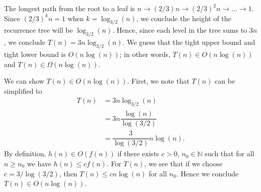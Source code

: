 \documentclass[11pt, letterpaper, titlepage]{article}
\begin{document}
\begin{enumerate}[label=\alph*)]
    \begin{figure}[H]
    \centering
    \end{figure}

    The longest path from the root to a leaf is $n \rightarrow (2/3)n \rightarrow (2/3)^2n \rightarrow \ldots \rightarrow 1$. Since $(2/3)^kn = 1$ when $k = \log_{3/2}(n)$, we conclude the height of the recurrence tree will be $\log_{3/2}(n)$. Hence, since each level in the tree sums to $3n$, we conclude $T(n) = 3n\log_{3/2}(n)$. We guess that the tight upper bound and tight lower bound is $O(n\log(n))$; in other words, $T(n) \in O(n\log(n))$ and $T(n) \in \Omega(n\log(n))$.
    
    We can show $T(n) \in O(n\log(n))$. First, we note that $T(n)$ can be simplified to
    \begin{align}
        T(n) &= 3n\log_{3/2}(n) \\
        &= 3n\dfrac{\log(n)}{\log(3/2)} \\
        &= \dfrac{3}{\log(3/2)}n\log(n).
    \end{align}
    By definition, $h(n) \in O(f(n))$ if there exists $c > 0$, $n_0 \in \mathbb{N}$ such that for all $n \geq n_0$ we have $h(n) \leq cf(n)$. For $T(n)$, we see that if we choose $c = 3/\log(3/2)$, then $T(n) \leq cn\log(n)$ for all $n_0$. Hence we conclude $T(n) \in O(n\log(n))$.


\end{enumerate}
\end{document}
